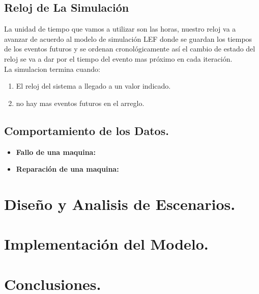 \documentclass[10pt]{article}
\begin{document}
\subsection{Reloj de La Simulación}

La unidad de tiempo que vamos a utilizar son las horas, nuestro reloj va a avanzar de acuerdo al modelo de simulación LEF donde se guardan los tiempos de los eventos futuros y se ordenan cronológicamente así el cambio de estado del reloj  se va a dar por el tiempo del evento mas próximo en cada iteración.\\

La simulacion termina cuando:
\begin{enumerate}
\item El reloj del sistema a llegado a un valor indicado.
\item no hay mas eventos futuros en el arreglo.
\end{enumerate}

\subsection{Comportamiento de los Datos.}

\begin{itemize}
\item \textbf{Fallo de una maquina:}
\item \textbf{Reparación de una maquina:}

\end{itemize}



\section{Diseño y Analisis de Escenarios.} 


\section{Implementación del Modelo.}




\section{Conclusiones.}
\end{document}
